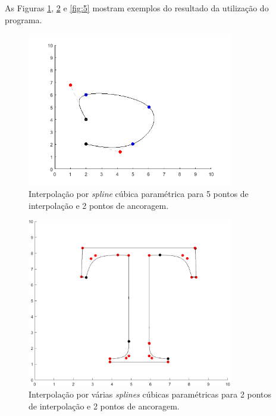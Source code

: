 \documentclass{article}
\begin{document}
\begin{enumerate}
\begin{enumerate}
                    As Figuras \ref{fig:abcde}, \ref{fig:t} e \ref{fig:5} mostram
                    exemplos do resultado da utilização do programa.

                    \begin{figure}[!h]
                        \centering
                        \includegraphics[width=0.8\textwidth]{images/abcde.png}
                        \caption{Interpolação por \textit{spline} cúbica paramétrica
                        para 5 pontos de interpolação e 2 pontos de ancoragem.}
                        \label{fig:abcde}
                    \end{figure}

                    \begin{figure}[!h]
                        \centering
                        \includegraphics[width=0.8\textwidth]{images/t.png}
                        \caption{Interpolação por várias \textit{splines} cúbicas paramétricas
                        para 2 pontos de interpolação e 2 pontos de ancoragem.}
                        \label{fig:t}
                    \end{figure}


\end{enumerate}
\end{enumerate}
\end{document}
